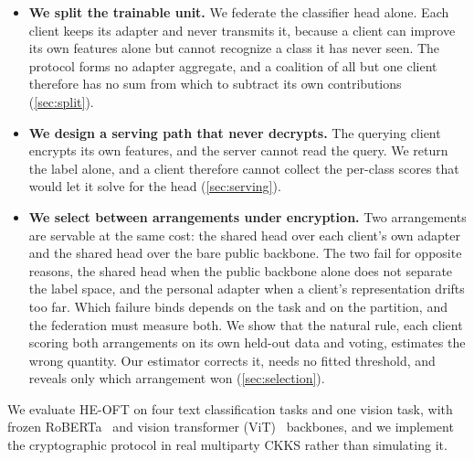 \begin{itemize}
\item \textbf{We split the trainable unit.} We federate the classifier head alone.
  Each client keeps its adapter and never transmits it, because a client can improve
  its own features alone but cannot recognize a class it has never seen. The protocol
  forms no adapter aggregate, and a coalition of all but one client therefore has no
  sum from which to subtract its own contributions (\cref{sec:split}).

\item \textbf{We design a serving path that never decrypts.} The querying client
  encrypts its own features, and the server cannot read the query. We return the
  label alone, and a client therefore cannot collect the per-class scores that would
  let it solve for the head (\cref{sec:serving}).

\item \textbf{We select between arrangements under encryption.} Two arrangements are
  servable at the same cost: the shared head over each client's own adapter and the
  shared head over the bare public backbone. The two fail for opposite reasons, the shared head when the public backbone alone does not separate the label space, and the personal adapter when a client's representation drifts too far. Which failure binds depends on the task and on the partition, and the federation must measure both. We show that the natural rule, each client scoring both arrangements on its own held-out data and voting, estimates the wrong quantity. Our estimator corrects it, needs no fitted threshold, and reveals only which arrangement won (\cref{sec:selection}).

\end{itemize}

\noindent We evaluate HE-OFT on four text classification tasks and one vision task, with
frozen RoBERTa~\cite{liu2019roberta} and vision transformer (ViT)~\cite{dosovitskiy2021vit} backbones, and we implement the cryptographic protocol in
real multiparty CKKS rather than simulating it.
